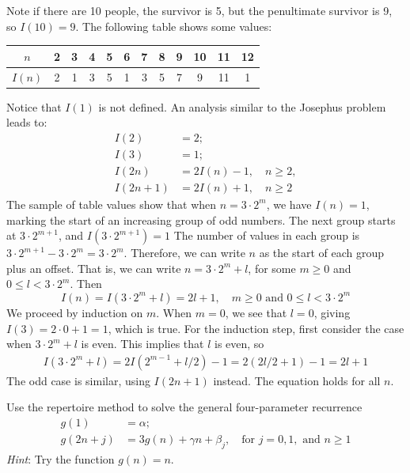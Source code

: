 \documentclass[12pt]{article}
\newenvironment{ex}[2][Exercise]{\begin{trivlist}
		\item[\hskip \labelsep {\bfseries #1}\hskip \labelsep {\bfseries #2.}]}{\end{trivlist}}
\newenvironment{sol}[1][Solution]{\begin{trivlist}
		\item[\hskip \labelsep {\bfseries #1:}]}{\end{trivlist}}
\begin{document}
\begin{sol}
	Note if there are 10 people, the survivor is 5, but the penultimate survivor
	is 9, so $I(10)=9$. The following table shows some values:
	\begin{center}
		\begin{tabular}{c|c|ccc|cccccc|c}
			$n$    & 2 & 3 & 4 & 5 & 6 & 7 & 8 & 9 & 10 &  11 & 12\\
			\hline
			$I(n)$ & 2 & 1 & 3 & 5 & 1 & 3 & 5 & 7 & 9  &  11 & 1
		\end{tabular}
	\end{center}
	Notice that $I(1)$ is not defined. An analysis similar to the Josephus
	problem leads to:
	\begin{align*}
		I(2)&=2;\\
		I(3)&=1;\\
		I(2n)&=2I(n)-1,\quad n\geq 2,\\
		I(2n+1)&=2I(n)+1,\quad n\geq 2
	\end{align*}
	The sample of table values show that when $n=3\cdot 2^{m}$,
	we have $I(n)=1$, marking the start of an increasing group of odd
	numbers. The next group starts at $3\cdot 2^{m+1}$, and $I(3\cdot 2^{m+1})=1$
	The number of values in each group is
	$3\cdot 2^{m+1}-3\cdot 2^{m}=3\cdot 2^{m}$. Therefore, we can write
	$n$ as the start of each group plus an offset. That is, we can write
	$n=3\cdot 2^{m}+l$, for some $m\geq 0$ and $0\leq l < 3\cdot 2^{m}$.
	Then
	\[
	I(n)=I(3\cdot 2^{m}+l)=2l+1,\quad m\geq 0 \text{ and } 0\leq l< 3\cdot 2^{m}
	\]
	We proceed by induction on $m$. When $m=0$, we see that $l=0$, giving
	$I(3)=2\cdot 0 + 1=1$, which is true. For the induction step, first
	consider the case when $3\cdot 2^{m}+l$ is even. This implies that
	$l$ is even, so
	\begin{align*}
		I(3\cdot 2^m + l)=2I(2^{m-1}+l/2)-1=2(2l/2 + 1)-1=2l+1
	\end{align*}
	The odd case is similar, using $I(2n+1)$ instead. The equation holds
	for all $n$.
\end{sol}

\begin{ex}{16}
	Use the repertoire method to solve the general four-parameter recurrence
	\begin{align*}
		g(1)&=\alpha;\\
		g(2n+j)&=3g(n)+\gamma n+\beta_j,\quad \text{for } j=0,1,\text{ and } n\geq 1
	\end{align*}
	\emph{Hint}: Try the function $g(n)=n$.
\end{ex}
\end{document}
